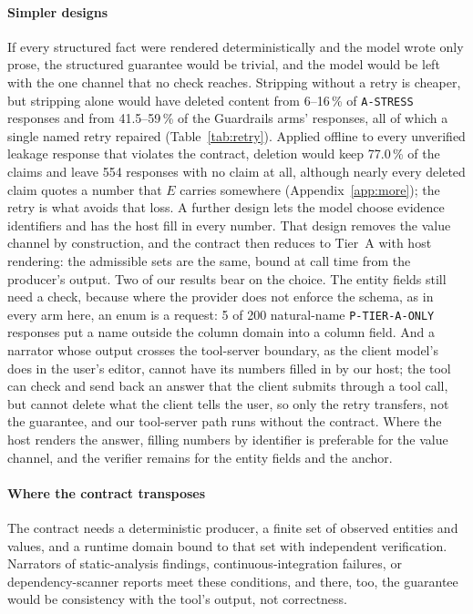 \documentclass[10pt,twocolumn]{article}
\begin{document}
\paragraph{Simpler designs}
If every structured fact were rendered deterministically and the model wrote
only prose, the structured guarantee would be trivial, and the model would be
left with the one channel that no check reaches. Stripping without a retry is
cheaper, but stripping alone would have deleted content from 6--16\,\% of
\texttt{A-STRESS} responses and from 41.5--59\,\% of the Guardrails arms'
responses, all of which a single named retry repaired (Table~\ref{tab:retry}).
Applied offline to every unverified leakage response that violates the
contract, deletion would keep 77.0\,\% of the claims and leave 554 responses
with no claim at all, although nearly every deleted claim quotes a number that
$E$ carries somewhere (Appendix~\ref{app:more}); the retry is what avoids that
loss.
A further design lets the model choose evidence identifiers and has the host
fill in every number. That design removes the value channel by construction,
and the contract then reduces to Tier~A with host rendering: the admissible
sets are the same, bound at call time from the producer's output. Two of our
results bear on the choice. The entity fields still need a check, because
where the provider does not enforce the schema, as in every arm here, an enum is
a request: 5 of 200 natural-name
\texttt{P-TIER-A-ONLY} responses put a name outside the column domain into a
column field. And a narrator whose output crosses the tool-server boundary, as
the client model's does in the user's editor, cannot have its numbers filled
in by our host; the tool can check and send back an answer that the client
submits through a tool call, but cannot delete what the client tells the user,
so only the retry transfers, not the guarantee, and our tool-server path runs
without the contract. Where the host renders
the answer, filling numbers by identifier is preferable for the value channel,
and the verifier remains for the entity fields and the anchor.


\paragraph{Where the contract transposes}
The contract needs a deterministic producer, a finite set of observed entities
and values, and a runtime domain bound to that set with independent
verification. Narrators of static-analysis findings, continuous-integration
failures, or dependency-scanner reports meet these conditions, and there, too,
the guarantee would be consistency with the tool's output, not correctness.
\end{document}

